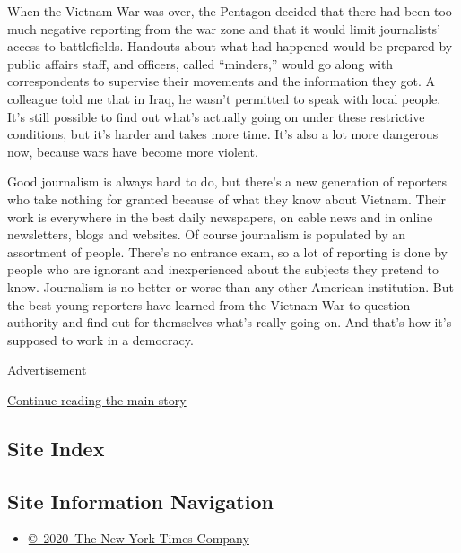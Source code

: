 When the Vietnam War was over, the Pentagon decided that there had been
too much negative reporting from the war zone and that it would limit
journalists' access to battlefields. Handouts about what had happened
would be prepared by public affairs staff, and officers, called
``minders,'' would go along with correspondents to supervise their
movements and the information they got. A colleague told me that in
Iraq, he wasn't permitted to speak with local people. It's still
possible to find out what's actually going on under these restrictive
conditions, but it's harder and takes more time. It's also a lot more
dangerous now, because wars have become more violent.

Good journalism is always hard to do, but there's a new generation of
reporters who take nothing for granted because of what they know about
Vietnam. Their work is everywhere in the best daily newspapers, on cable
news and in online newsletters, blogs and websites. Of course journalism
is populated by an assortment of people. There's no entrance exam, so a
lot of reporting is done by people who are ignorant and inexperienced
about the subjects they pretend to know. Journalism is no better or
worse than any other American institution. But the best young reporters
have learned from the Vietnam War to question authority and find out for
themselves what's really going on. And that's how it's supposed to work
in a democracy.

Advertisement

\protect\hyperlink{after-bottom}{Continue reading the main story}

\hypertarget{site-index}{%
\subsection{Site Index}\label{site-index}}

\hypertarget{site-information-navigation}{%
\subsection{Site Information
Navigation}\label{site-information-navigation}}

\begin{itemize}
\tightlist
\item
  \href{https://help.nytimes3xbfgragh.onion/hc/en-us/articles/115014792127-Copyright-notice}{©~2020~The
  New York Times Company}
\end{itemize}

